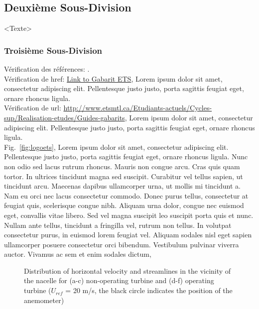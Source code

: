 \documentclass[letterpaper, twoside, 12pt,these,creativecommons,hyperref]{thETS}
\begin{document}
\subsection{Deuxième Sous-Division}
<Texte>

\subsubsection{Troisième Sous-Division}

Vérification des références: \cite{Arica2002}.
\\
Vérification de href: \href{http://www.etsmtl.ca/Etudiants-actuels/Cycles-sup/Realisation-etudes/Guides-gabarits}{Link to Gabarit ETS}, Lorem ipsum dolor sit amet, consectetur adipiscing elit. Pellentesque justo justo, porta sagittis feugiat eget, ornare rhoncus ligula.
\\
Vérification de url: \url{http://www.etsmtl.ca/Etudiants-actuels/Cycles-sup/Realisation-etudes/Guides-gabarits}, Lorem ipsum dolor sit amet, consectetur adipiscing elit. Pellentesque justo justo, porta sagittis feugiat eget, ornare rhoncus ligula.
\\
Fig.~\ref{fig:logoets}, Lorem ipsum dolor sit amet, consectetur adipiscing elit. Pellentesque justo justo, porta sagittis feugiat eget, ornare rhoncus ligula. Nunc non odio sed lacus rutrum rhoncus. Mauris non congue arcu. Cras quis quam tortor. In ultrices tincidunt magna sed suscipit. Curabitur vel tellus sapien, ut tincidunt arcu. Maecenas dapibus ullamcorper urna, ut mollis mi tincidunt a. Nam eu orci nec lacus consectetur commodo. Donec purus tellus, consectetur at feugiat quis, scelerisque congue nibh. Aliquam urna dolor, congue nec euismod eget, convallis vitae libero. Sed vel magna suscipit leo suscipit porta quis et nunc. Nullam ante tellus, tincidunt a fringilla vel, rutrum non tellus. In volutpat consectetur purus, in euismod lorem feugiat vel. Aliquam sodales nisl eget sapien ullamcorper posuere consectetur orci bibendum. Vestibulum pulvinar viverra auctor. Vivamus ac sem et enim sodales dictum, 
%
\begin{figure}[ht]
	\centering
	\caption{Distribution of horizontal velocity and streamlines in the vicinity of the nacelle for (a-c) non-operating turbine and (d-f) operating turbine ($U_{ref}$ = 20 m/s, the black circle indicates the position of the anemometer)}
\end{figure}
\end{document}
